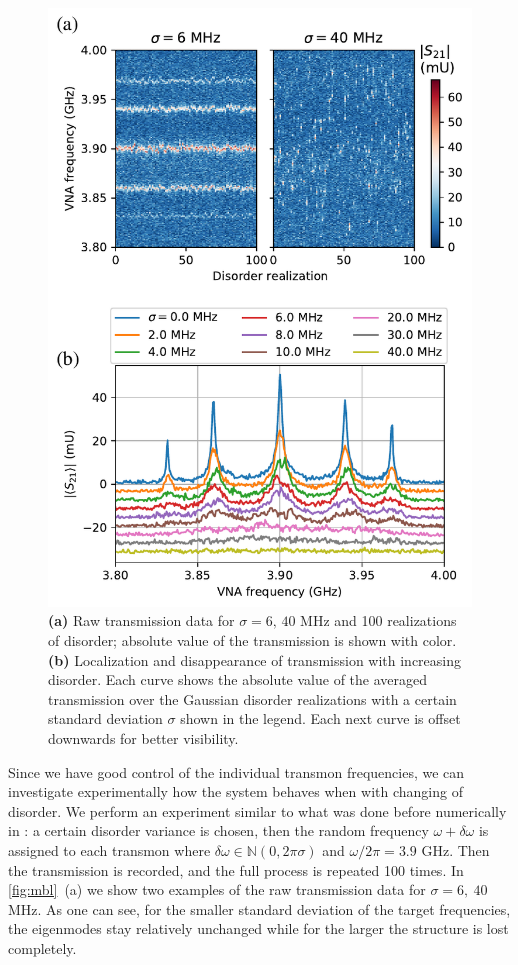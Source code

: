 \documentclass[%
 aps, pra,
 amsmath,amssymb,
 reprint,%
superscriptaddress
]{revtex4-2}
\begin{document}
\begin{figure}
	\includegraphics[width=1\linewidth]{Pictures/mbl}
	\caption{\textbf{(a)} Raw transmission data for $\sigma = 6,\, 40$ MHz and 100 realizations of disorder; absolute value of the transmission is shown with color. \textbf{(b)} Localization and disappearance of transmission with increasing disorder. Each curve shows the absolute value of the averaged transmission over the Gaussian disorder realizations with a certain standard deviation $\sigma$ shown in the legend. Each next curve is offset downwards for better visibility.}
	\label{fig:mbl}
\end{figure}

Since we have good control of the individual transmon frequencies, we can investigate experimentally how the system behaves when with changing of disorder. We perform an experiment similar to what was done before numerically in \cite{orell2019probing}: a certain disorder variance is chosen, then the random frequency $\omega + \delta \omega$ is assigned to each transmon where $\delta\omega \in \mathbb N(0,2\pi\sigma)$ and $\omega/2\pi = 3.9$ GHz. Then the transmission is recorded, and the full process is repeated 100 times. 
In \autoref{fig:mbl}~(a) we show two examples of the raw transmission data for  $\sigma = 6,\ 40$ MHz. As one can see, for the smaller standard deviation of the target frequencies, the eigenmodes stay relatively unchanged while for the larger the structure is lost completely.
\end{document}

